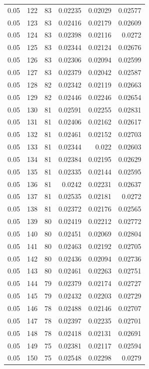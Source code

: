 \begin{tabular}{rrrrrr}
0.05 & 122 & 83 & 0.02235 & 0.02029 & 0.02577 \\
0.05 & 123 & 83 & 0.02416 & 0.02179 & 0.02609 \\
0.05 & 124 & 83 & 0.02398 & 0.02116 & 0.0272 \\
0.05 & 125 & 83 & 0.02344 & 0.02124 & 0.02676 \\
0.05 & 126 & 83 & 0.02306 & 0.02094 & 0.02599 \\
0.05 & 127 & 83 & 0.02379 & 0.02042 & 0.02587 \\
0.05 & 128 & 82 & 0.02342 & 0.02119 & 0.02663 \\
0.05 & 129 & 82 & 0.02446 & 0.02246 & 0.02654 \\
0.05 & 130 & 81 & 0.02591 & 0.02255 & 0.02831 \\
0.05 & 131 & 81 & 0.02406 & 0.02162 & 0.02617 \\
0.05 & 132 & 81 & 0.02461 & 0.02152 & 0.02703 \\
0.05 & 133 & 81 & 0.02344 & 0.022 & 0.02603 \\
0.05 & 134 & 81 & 0.02384 & 0.02195 & 0.02629 \\
0.05 & 135 & 81 & 0.02335 & 0.02144 & 0.02595 \\
0.05 & 136 & 81 & 0.0242 & 0.02231 & 0.02637 \\
0.05 & 137 & 81 & 0.02535 & 0.02181 & 0.0272 \\
0.05 & 138 & 81 & 0.02372 & 0.02176 & 0.02565 \\
0.05 & 139 & 80 & 0.02419 & 0.02212 & 0.02772 \\
0.05 & 140 & 80 & 0.02451 & 0.02069 & 0.02804 \\
0.05 & 141 & 80 & 0.02463 & 0.02192 & 0.02705 \\
0.05 & 142 & 80 & 0.02436 & 0.02094 & 0.02736 \\
0.05 & 143 & 80 & 0.02461 & 0.02263 & 0.02751 \\
0.05 & 144 & 79 & 0.02379 & 0.02174 & 0.02727 \\
0.05 & 145 & 79 & 0.02432 & 0.02203 & 0.02729 \\
0.05 & 146 & 78 & 0.02488 & 0.02146 & 0.02707 \\
0.05 & 147 & 78 & 0.02397 & 0.02235 & 0.02701 \\
0.05 & 148 & 78 & 0.02418 & 0.02131 & 0.02691 \\
0.05 & 149 & 75 & 0.02381 & 0.02117 & 0.02594 \\
0.05 & 150 & 75 & 0.02548 & 0.02298 & 0.0279 \\
\bottomrule
\end{tabular}
